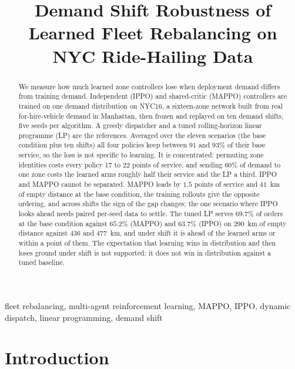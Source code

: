 \documentclass[conference]{IEEEtran}
\begin{document}
\title{Demand Shift Robustness of Learned Fleet Rebalancing on NYC Ride-Hailing Data}

\author{%
\and
{}
%
}

\maketitle

\begin{abstract}
We measure how much learned zone controllers lose when deployment demand
differs from training demand. Independent (IPPO) and shared-critic (MAPPO)
controllers are trained on one demand distribution on NYC16, a sixteen-zone
network built from real for-hire-vehicle demand in Manhattan, then frozen and
replayed on ten demand shifts, five seeds per algorithm. A greedy dispatcher
and a tuned rolling-horizon linear programme (LP) are the references. Averaged
over the eleven scenarios (the base condition plus ten shifts) all four
policies keep between $91$ and $93\%$ of their base service, so the loss is not
specific to learning. It is concentrated: permuting zone identities costs every
policy $17$ to $22$ points of service, and sending $60\%$ of demand to one zone
costs the learned arms roughly half their service and the LP a third. IPPO and
MAPPO cannot be separated. MAPPO leads by $1.5$ points of service and $41$~km
of empty distance at the base condition, the training rollouts give the
opposite ordering, and across shifts the sign of the gap changes; the one
scenario where IPPO looks ahead needs paired per-seed data to settle. The tuned
LP serves $69.7\%$ of orders at the base condition against $65.2\%$ (MAPPO) and
$63.7\%$ (IPPO) on $290$~km of empty distance against $436$ and $477$~km, and
under shift it is ahead of the learned arms or within a point of them. The
expectation that learning wins in distribution and then loses ground under
shift is not supported: it does not win in distribution against a tuned
baseline.
\end{abstract}

\begin{IEEEkeywords}
fleet rebalancing, multi-agent reinforcement learning, MAPPO, IPPO, dynamic
dispatch, linear programming, demand shift
\end{IEEEkeywords}

\section{Introduction}
\label{sec:intro}
\end{document}
